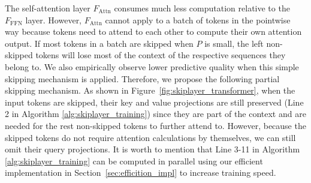 \documentclass{article}
\begin{document}
The self-attention layer $F_{\text{Attn}}$ consumes much less computation relative to the $F_{\text{FFN}}$ layer. However, $F_{\text{Attn}}$ cannot apply to a batch of tokens in the pointwise way because tokens need to attend to each other to compute their own attention output. If most tokens in a batch are skipped when $P$ is small, the left non-skipped tokens will lose most of the context of the respective sequences they belong to. We also empirically observe lower predictive quality when this simple skipping mechanism is applied. Therefore, we propose the following partial skipping mechanism. As shown in Figure~\ref{fig:skiplayer_transformer}, when the input tokens are skipped, their key and value projections are still preserved (Line 2 in Algorithm \ref{alg:skiplayer_training}) since they are part of the context and are needed for the rest non-skipped tokens to further attend to. However, because the skipped tokens do not require attention calculations by themselves, we can still omit their query projections. It is worth to mention that Line 3-11 in Algorithm \ref{alg:skiplayer_training} can be computed in parallel using our efficient implementation in Section~\ref{sec:efficition_impl} to increase training speed.



\end{document}
